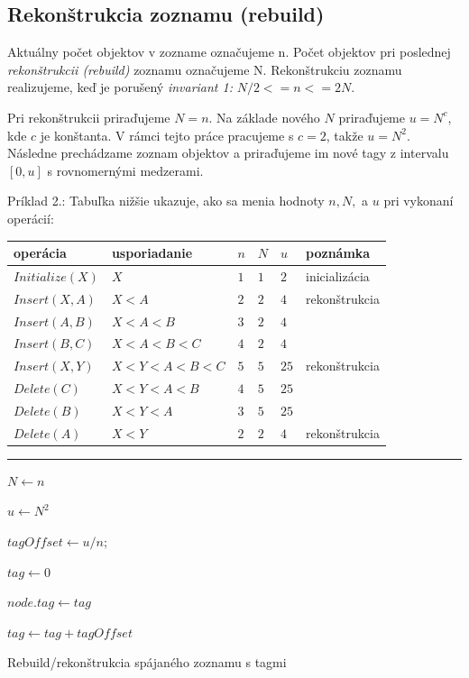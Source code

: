 \documentclass[
  digital,     %
  oneside,     %
  nosansbold,  %
  nocolorbold, %
  lof,         %
  lot,         %
]{fithesis4}
\begin{document}
\subsection{Rekonštrukcia zoznamu (rebuild)}

Aktuálny počet objektov v zozname označujeme n. Počet objektov pri poslednej \textit{rekonštrukcii (rebuild)} zoznamu označujeme N. Rekonštrukciu zoznamu realizujeme, keď je porušený \textit{invariant 1:} $N/2 <= n <= 2N$.

Pri rekonštrukcii priraďujeme $N = n$. Na základe nového $N$ priraďujeme $u = N^c$, kde $c$ je konštanta. V rámci tejto práce pracujeme s $c = 2$, takže $u = N^2$. Následne prechádzame zoznam objektov a priraďujeme im nové tagy z intervalu $[0, u]$ s rovnomernými medzerami.

Príklad 2.:
Tabuľka nižšie ukazuje, ako sa menia hodnoty $n, N,$ a $u$ pri vykonaní operácií:
\begin{table}
\begin{tabularx}{\textwidth}{| l | l | l | l | l | l}
    operácia & usporiadanie & $n$ & $N$ & $u$ & poznámka \\
    \midrule
    $Initialize(X)$ & $X$ & $1$ & $1$ & $2$ & inicializácia\\
    $Insert(X, A)$ & $X < A$ & $2$ & $2$ & $4$ & rekonštrukcia\\
    $Insert(A, B)$ & $X < A < B$ & $3$ & $2$ & $4$ & \\
    $Insert(B, C)$ & $X < A < B < C$ & $4$ & $2$ & $4$ & \\
    $Insert(X, Y)$ & $X < Y < A < B < C$ & $5$ & $5$ & $25$ & rekonštrukcia\\
    $Delete(C)$ & $X < Y < A < B$ & $4$ & $5$ & $25$ & \\
    $Delete(B)$ & $X < Y < A $ & $3$ & $5$ & $25$ & \\
    $Delete(A)$ & $X < Y$ & $2$ & $2$ & $4$ & rekonštrukcia\\
  \end{tabularx}
\end{table}

\begin{algorithm}
\hrule\vspace{0.2em}
$N \leftarrow n$\;

$u \leftarrow N^2$\;

$tagOffset \leftarrow u / n$; 

$tag \leftarrow 0$\;

{
    $node.tag \leftarrow tag$\;
    
    $tag \leftarrow tag + tagOffset$\;
}

\caption{Rebuild/rekonštrukcia spájaného zoznamu s tagmi}
\end{algorithm}
\end{document}
